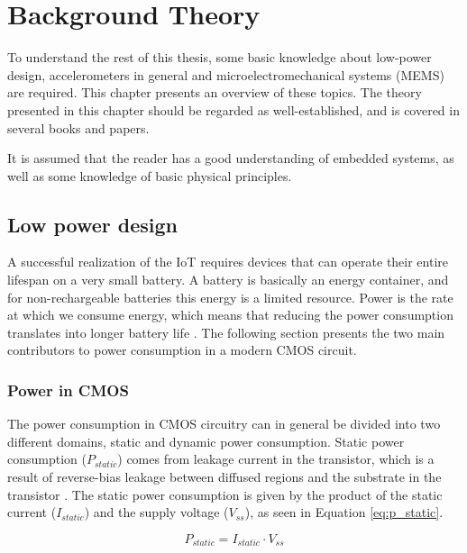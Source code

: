 \chapter{Background Theory}
\label{chap:theory}

To understand the rest of this thesis, some basic knowledge about low-power design, accelerometers in general and microelectromechanical systems (MEMS) are required. This chapter presents an overview of these topics. The theory presented in this chapter should be regarded as well-established, and is covered in several books and papers.

It is assumed that the reader has a good understanding of embedded systems, as well as some knowledge of basic physical principles. 

\section{Low power design}

A successful realization of the IoT requires devices that can operate their entire lifespan on a very small battery. A battery is basically an energy container, and for non-rechargeable batteries this energy is a limited resource. Power is the rate at which we consume energy, which means that reducing the power consumption translates into longer battery life \cite[~p.3]{holberg06}. The following section presents the two main contributors to power consumption in a modern CMOS circuit. 

\subsection{Power in CMOS}
\label{sec:cmos_power}

The power consumption in CMOS circuitry can in general be divided into two different domains, static and dynamic power consumption. Static power consumption ($P_{static}$) comes from leakage current in the transistor, which is a result of reverse-bias leakage between diffused regions and the
substrate in the transistor \cite{static_dynamic_power}. The static power consumption is given by the product of the static current ($I_{static}$) and the supply voltage ($V_{ss}$), as seen in Equation \ref{eq:p_static}. 

\begin{equation}
P_{static} = I_{static} \cdot V_{ss}
\label{eq:p_static}
\end{equation}

